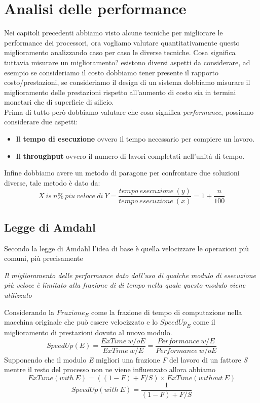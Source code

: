 \section{Analisi delle performance}\label{capitolo9}
Nei capitoli precedenti abbiamo visto alcune tecniche per migliorare le performance dei processori, ora vogliamo valutare quantitativamente questo miglioramento analizzando caso per caso le diverse tecniche.
Cosa significa tuttavia misurare un miglioramento? esistono diversi aspetti da considerare, ad esempio se consideriamo il costo dobbiamo tener presente il rapporto costo/prestazioni, se consideriamo il design di un sistema dobbiamo misurare il miglioramento delle prestazioni rispetto all'aumento di costo sia in termini monetari che di superficie di silicio.\\
Prima di tutto però dobbiamo valutare che cosa significa \emph{performance}, possiamo considerare due aspetti:
\begin{itemize}
\item Il \textbf{tempo di esecuzione} ovvero il tempo necessario per compiere un lavoro.
\item Il \textbf{throughput} ovvero il numero di lavori completati nell'unità di tempo.
\end{itemize}
Infine dobbiamo avere un metodo di paragone per confrontare due soluzioni diverse, tale metodo è dato da:
$$X \ is \ n\% \ piu \ veloce \ di \ Y = \frac{tempo \ esecuzione \ (y)}{tempo \ esecuzione \ (x)} = 1 + \frac{n}{100}$$
\subsection{Legge di Amdahl}
Secondo la legge di Amdahl l'idea di base è quella velocizzare le operazioni più comuni, più precisamente
\begin{center}
\textit{Il miglioramento delle performance dato dall'uso di qualche modulo di esecuzione più veloce è limitato alla frazione di di tempo nella quale questo modulo viene utilizzato}
\end{center}
Considerando la \textbf{$Frazione_E$} come la frazione di tempo di computazione nella macchina originale che può essere velocizzato e lo \textbf{$SpeedUp_E$} come il miglioramento di prestazioni dovuto al nuovo modulo.
$$SpeedUp(E) = \frac{ExTime \ w/o E}{ExTime \ w/ E} = \frac{Performance \ w/ E}{Performance \ w/o E}$$
Supponendo che il modulo \emph{E} migliori una frazione \emph{F} del lavoro di un fattore \emph{S} mentre il resto del processo non ne viene influenzato allora abbiamo
$$ExTime(with \ E) = ((1-F)+F/S) \times ExTime(without \ E)$$
$$SpeedUp(with \ E) = \frac{1}{(1-F) + F/S}$$
